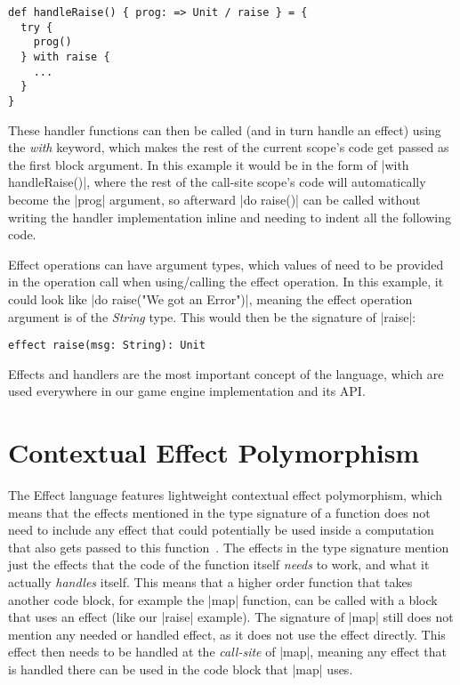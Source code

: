 \begin{lstlisting}
def handleRaise() { prog: => Unit / raise } = {
  try {
    prog()
  } with raise {
    ...
  }
}
\end{lstlisting}

These handler functions can then be called (and in turn handle an effect) using the \textit{with} keyword, which makes the rest of the current scope's code get passed as the first block argument. In this example it would be in the form of |with handleRaise()|, where the rest of the call-site scope's code will automatically become the |prog| argument, so afterward |do raise()| can be called without writing the handler implementation inline and needing to indent all the following code.

Effect operations can have argument types, which values of need to be provided in the operation call when using/calling the effect operation. In this example, it could look like |do raise("We got an Error")|, meaning the effect operation argument is of the \textit{String} type. This would then be the signature of |raise|:

\begin{lstlisting}
effect raise(msg: String): Unit
\end{lstlisting}

Effects and handlers are the most important concept of the language, which are used everywhere in our game engine implementation and its API.

\section{Contextual Effect Polymorphism}

The Effect language features lightweight contextual effect polymorphism, which means that the effects mentioned in the type signature of a function does not need to include any effect that could potentially be used inside a computation that also gets passed to this function~\cite{brachthauser2020effects}. The effects in the type signature mention just the effects that the code of the function itself \textit{needs} to work, and what it actually \textit{handles} itself. This means that a higher order function that takes another code block, for example the |map| function, can be called with a block that uses an effect (like our |raise| example). The signature of |map| still does not mention any needed or handled effect, as it does not use the effect directly. This effect then needs to be handled at the \textit{call-site} of |map|, meaning any effect that is handled there can be used in the code block that |map| uses.

